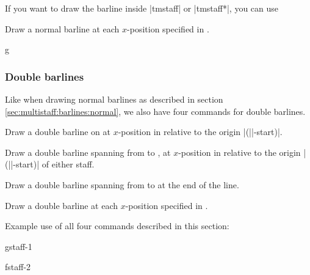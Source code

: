 If you want to draw the barline inside |{tmstaff}| or |{tmstaff*}|, 
you can use 
\begin{command}{\tmbarlineinline{}}
  Draw a normal barline at each $x$-position specified in .
\end{command}
\begin{codeexample}[]
\begin{tmline}%
\begin{tmstaff}{g}{}
\end{tmstaff}%
\end{tmline}
\end{codeexample}
\subsubsection{Double barlines}\label{sec:multistaff:barlines:double}
Like when drawing normal barlines as described in section 
\ref{sec:multistaff:barlines:normal}, 
we also have four commands for double barlines.
\begin{command}{\tmdoublebarline{}}
  Draw a double barline on  at $x$-position  in 
  relative to the origin |(||-start)|.
\end{command}
\begin{command}{\tmdoublebarline*{}}
  Draw a double barline spanning from  to 
  , at $x$-position  in relative to 
  the origin |(||-start)| of either staff.
\end{command}
\begin{command}{\tmdoublebarlineendline{}}
  Draw a double barline spanning from  to 
   at the end of the line.
\end{command}
\begin{command}{\tmdoublebarlineinline{}}
  Draw a double barline at each $x$-position specified in .
\end{command}
Example use of all four commands described in this section:
\begin{codeexample}[]
\begin{tmline}%
\begin{tmstaff}{g}{staff-1}\end{tmstaff}%
\begin{tmstaff}{f}{staff-2}
\end{tmstaff}%
%
%
%
%
\end{tmline}
\end{codeexample}
